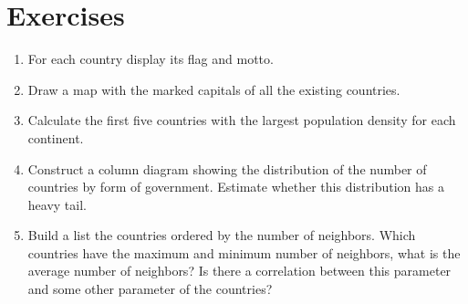 \section{Exercises}
\begin{enumerate}
	\item For each country display its flag and motto.
	\item Draw a map with the marked capitals of all the existing countries.
	\item Calculate the first five countries with the largest population density for each continent.
	\item Construct a column diagram showing the distribution of the number of countries by form of government. Estimate whether this distribution has a heavy tail.
	\item Build a list the countries ordered by the number of neighbors. Which countries have the maximum and minimum number of neighbors, what is the average number of neighbors? Is there a correlation between this parameter and some other parameter of the countries?
\end{enumerate}